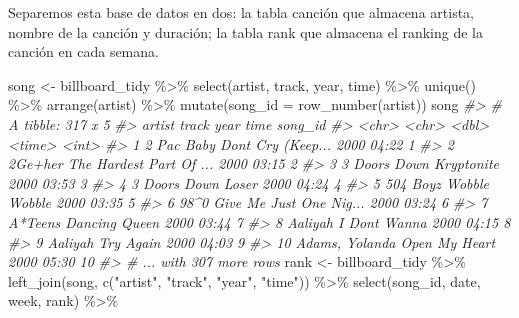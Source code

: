 \documentclass[
]{book}
\newenvironment{Shaded}{\begin{snugshade}}{\end{snugshade}}
\newcommand{\AttributeTok}[1]{\textcolor[rgb]{0.77,0.63,0.00}{#1}}
\newcommand{\CommentTok}[1]{\textcolor[rgb]{0.56,0.35,0.01}{\textit{#1}}}
\newcommand{\FunctionTok}[1]{\textcolor[rgb]{0.00,0.00,0.00}{#1}}
\newcommand{\NormalTok}[1]{#1}
\newcommand{\OtherTok}[1]{\textcolor[rgb]{0.56,0.35,0.01}{#1}}
\newcommand{\SpecialCharTok}[1]{\textcolor[rgb]{0.00,0.00,0.00}{#1}}
\newcommand{\StringTok}[1]{\textcolor[rgb]{0.31,0.60,0.02}{#1}}
\begin{document}
Separemos esta base de datos en dos: la tabla canción que almacena artista,
nombre de la canción y duración; la tabla rank que almacena el ranking de la
canción en cada semana.

\begin{Shaded}
\begin{Highlighting}[]
\NormalTok{song }\OtherTok{\textless{}{-}}\NormalTok{ billboard\_tidy }\SpecialCharTok{\%\textgreater{}\%} 
  \FunctionTok{select}\NormalTok{(artist, track, year, time) }\SpecialCharTok{\%\textgreater{}\%}
  \FunctionTok{unique}\NormalTok{() }\SpecialCharTok{\%\textgreater{}\%}
  \FunctionTok{arrange}\NormalTok{(artist) }\SpecialCharTok{\%\textgreater{}\%}
  \FunctionTok{mutate}\NormalTok{(}\AttributeTok{song\_id =} \FunctionTok{row\_number}\NormalTok{(artist))}
\NormalTok{song}
\CommentTok{\#\textgreater{} \# A tibble: 317 x 5}
\CommentTok{\#\textgreater{}    artist         track                    year time   song\_id}
\CommentTok{\#\textgreater{}    \textless{}chr\textgreater{}          \textless{}chr\textgreater{}                   \textless{}dbl\textgreater{} \textless{}time\textgreater{}   \textless{}int\textgreater{}}
\CommentTok{\#\textgreater{}  1 2 Pac          Baby Don\textquotesingle{}t Cry (Keep...  2000 04:22        1}
\CommentTok{\#\textgreater{}  2 2Ge+her        The Hardest Part Of ...  2000 03:15        2}
\CommentTok{\#\textgreater{}  3 3 Doors Down   Kryptonite               2000 03:53        3}
\CommentTok{\#\textgreater{}  4 3 Doors Down   Loser                    2000 04:24        4}
\CommentTok{\#\textgreater{}  5 504 Boyz       Wobble Wobble            2000 03:35        5}
\CommentTok{\#\textgreater{}  6 98\^{}0           Give Me Just One Nig...  2000 03:24        6}
\CommentTok{\#\textgreater{}  7 A*Teens        Dancing Queen            2000 03:44        7}
\CommentTok{\#\textgreater{}  8 Aaliyah        I Don\textquotesingle{}t Wanna            2000 04:15        8}
\CommentTok{\#\textgreater{}  9 Aaliyah        Try Again                2000 04:03        9}
\CommentTok{\#\textgreater{} 10 Adams, Yolanda Open My Heart            2000 05:30       10}
\CommentTok{\#\textgreater{} \# ... with 307 more rows}
\NormalTok{rank }\OtherTok{\textless{}{-}}\NormalTok{ billboard\_tidy }\SpecialCharTok{\%\textgreater{}\%}
  \FunctionTok{left\_join}\NormalTok{(song, }\FunctionTok{c}\NormalTok{(}\StringTok{"artist"}\NormalTok{, }\StringTok{"track"}\NormalTok{, }\StringTok{"year"}\NormalTok{, }\StringTok{"time"}\NormalTok{)) }\SpecialCharTok{\%\textgreater{}\%}
  \FunctionTok{select}\NormalTok{(song\_id, date, week, rank) }\SpecialCharTok{\%\textgreater{}\%}

\end{Highlighting}
\end{Shaded}
\end{document}
